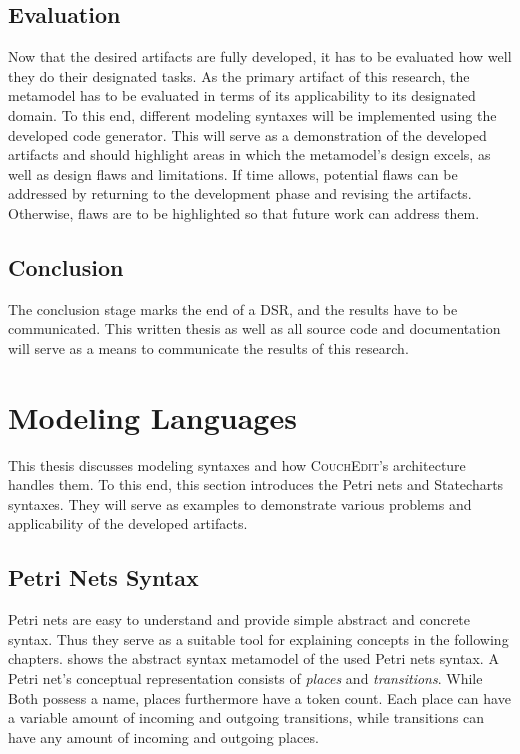 \subsection{Evaluation}
Now that the desired artifacts are fully developed, it has to be evaluated how well they do their designated tasks. As the primary artifact of this research, the metamodel has to be evaluated in terms of its applicability to its designated domain. To this end, different modeling syntaxes will be implemented using the developed code generator. This will serve as a demonstration of the developed artifacts and should highlight areas in which the metamodel's design excels, as well as design flaws and limitations. If time allows, potential flaws can be addressed by returning to the development phase and revising the artifacts. Otherwise, flaws are to be highlighted so that future work can address them.

\subsection{Conclusion}
The conclusion stage marks the end of a DSR, and the results have to be communicated. This written thesis as well as all source code and documentation will serve as a means to communicate the results of this research.


\section{Modeling Languages}
\label{sec:modeling-languages}
This thesis discusses modeling syntaxes and how \textsc{CouchEdit}'s architecture handles them. To this end, this section introduces the Petri nets and Statecharts syntaxes. They will serve as examples to demonstrate various problems and applicability of the developed artifacts. 

\subsection{Petri Nets Syntax}
\label{sec:petrinets}
Petri nets are easy to understand and provide simple abstract and concrete syntax. Thus they serve as a suitable tool for explaining concepts in the following chapters.  shows the abstract syntax metamodel of the used Petri nets syntax. A Petri net's conceptual representation consists of \emph{places} and \emph{transitions}. While Both possess a name, places furthermore have a token count. Each place can have a variable amount of incoming and outgoing transitions, while transitions can have any amount of incoming and outgoing places. 

